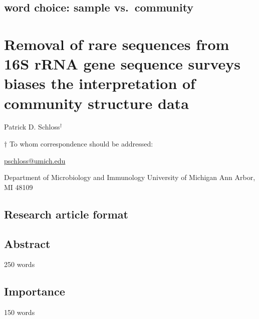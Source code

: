 \documentclass[]{article}
\author{}
\date{\vspace{-2.5em}}
\begin{document}
\subsection{word choice: sample
vs.~community}\label{word-choice-sample-vs.community}

\section{Removal of rare sequences from 16S rRNA gene sequence surveys
biases the interpretation of community structure
data}\label{removal-of-rare-sequences-from-16s-rrna-gene-sequence-surveys-biases-the-interpretation-of-community-structure-data}

\vspace{35mm}

Patrick D. Schloss${^\dagger}$

\vspace{40mm}

$\dagger$ To whom correspondence should be addressed:

\href{mailto:pschloss@umich.edu}{pschloss@umich.edu}

Department of Microbiology and Immunology University of Michigan Ann
Arbor, MI 48109

\vspace{35mm}

\subsection{Research article format}\label{research-article-format}

\newpage
\linenumbers

\subsection{Abstract}\label{abstract}

250 words

\newpage

\subsection{Importance}\label{importance}

150 words

\newpage
\end{document}
